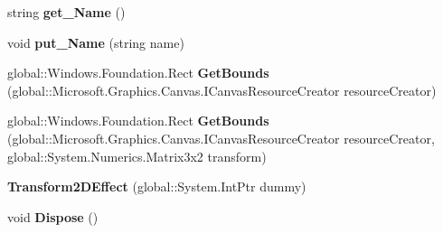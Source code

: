 \begin{DoxyCompactItemize}
\item 
\mbox{\label{class_microsoft_1_1_graphics_1_1_canvas_1_1_effects_1_1_transform2_d_effect_a331281b043139fe8aed31e8479d24a0c}} 
string {\bfseries get\+\_\+\+Name} ()
\item 
\mbox{\label{class_microsoft_1_1_graphics_1_1_canvas_1_1_effects_1_1_transform2_d_effect_a6fa072080d740ed6d704f3dc36b862cd}} 
void {\bfseries put\+\_\+\+Name} (string name)
\item 
\mbox{\label{class_microsoft_1_1_graphics_1_1_canvas_1_1_effects_1_1_transform2_d_effect_a639c1cb942d1e2f5df6eed9ed4630dda}} 
global\+::\+Windows.\+Foundation.\+Rect {\bfseries Get\+Bounds} (global\+::\+Microsoft.\+Graphics.\+Canvas.\+I\+Canvas\+Resource\+Creator resource\+Creator)
\item 
\mbox{\label{class_microsoft_1_1_graphics_1_1_canvas_1_1_effects_1_1_transform2_d_effect_ac6842a4b23389a0cf09a892e0a70cdd6}} 
global\+::\+Windows.\+Foundation.\+Rect {\bfseries Get\+Bounds} (global\+::\+Microsoft.\+Graphics.\+Canvas.\+I\+Canvas\+Resource\+Creator resource\+Creator, global\+::\+System.\+Numerics.\+Matrix3x2 transform)
\item 
\mbox{\label{class_microsoft_1_1_graphics_1_1_canvas_1_1_effects_1_1_transform2_d_effect_a3748c768254be919302047eede7038cd}} 
{\bfseries Transform2\+D\+Effect} (global\+::\+System.\+Int\+Ptr dummy)
\item 
\mbox{\label{class_microsoft_1_1_graphics_1_1_canvas_1_1_effects_1_1_transform2_d_effect_ac0a088ca93fab0d1da165143fccc2bf1}} 
void {\bfseries Dispose} ()
\item 
\mbox{\label{class_microsoft_1_1_graphics_1_1_canvas_1_1_effects_1_1_transform2_d_effect_a3e8f7b5eac9642f7b67f3051339ad6e0}} 

\end{DoxyCompactItemize}
